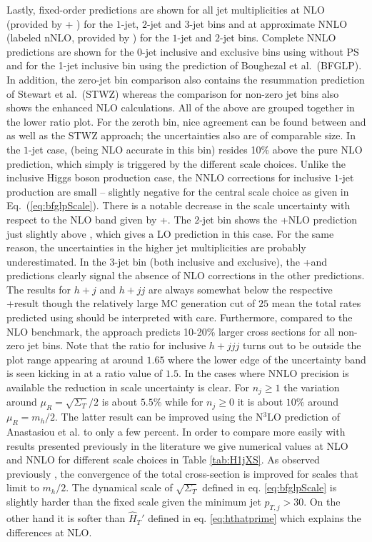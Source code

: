 Lastly, fixed-order predictions are shown for all jet multiplicities
at NLO (provided by \GoSam{}+ \Sherpa) for the $1$-jet, $2$-jet and
$3$-jet bins and at approximate NNLO (labeled nNLO, provided by \Loopsim) 
for the $1$-jet and $2$-jet bins.
Complete NNLO predictions are shown for the 0-jet inclusive and
exclusive bins using \Sherpa without PS and for the 1-jet inclusive
bin using the prediction of Boughezal et al.~(BFGLP).
In addition, the zero-jet bin comparison
also contains the resummation prediction of Stewart et
al.~(STWZ) whereas the comparison for non-zero jet bins also
shows the \Minlo enhanced NLO calculations. All of the above are
grouped together in the lower ratio plot. For the zeroth bin, nice
agreement can be found between \Powheg and \Sherpa \NNLOPS as well as
the STWZ approach; the uncertainties also are of comparable
size. In the $1$-jet case, \Powheg (being NLO accurate in this bin)
resides 10\% above the pure NLO prediction, which simply is triggered
by the different scale choices. Unlike the inclusive Higgs boson
production case, the NNLO corrections for inclusive $1$-jet production
are small -- slightly negative for the central scale choice as given
in Eq.~(\ref{eq:bfglpScale}). There is a notable decrease in the scale
uncertainty with respect to the NLO band given by \GoSam{}+\Sherpa. The $2$-jet bin
shows the \GoSam{}+\Sherpa NLO prediction just slightly above \Powheg, which
gives a LO prediction in this case. For the same reason, the \Powheg
uncertainties in the higher jet multiplicities are probably
underestimated. In the $3$-jet bin (both inclusive and exclusive), the
\GoSam{}+\Sherpa and \Sherpa \MEPSatNLO predictions clearly signal the absence of 
NLO corrections 
in the other predictions. The \Loopsim results for $h+j$ and
$h+jj$ are always somewhat below the respective \GoSam{}+\Sherpa result
though the relatively large MC generation cut of $25$ \gev mean
the total rates predicted using \Loopsim should be interpreted with care.
Furthermore, compared to the NLO benchmark, the \Minlo approach
predicts 10-20\% larger cross sections for all non-zero jet bins.
Note that the \Minlo ratio for inclusive
$h+jjj$ turns out to be outside the plot range appearing at around
$1.65$ where the lower edge of the uncertainty band is seen kicking in
at a ratio value of $1.5$. In the cases where NNLO precision is available
the reduction in scale uncertainty is clear. For $n_j\geq1$ the variation around
$\mu_R=\sqrt{\Sigma_T}/2$ is about $5.5\%$ while for $n_j\geq0$ it is about $10\%$
around $\mu_R=m_h/2$. The latter result can be improved using the N${}^3$LO prediction
of Anastasiou et al. \cite{Anastasiou:2015ema} to only a few percent. In order to compare more
easily with results presented previously in the literature we give numerical values at NLO and NNLO
for different scale choices in Table \ref{tab:H1jXS}. As observed previously \cite{Boughezal:2015dra},
the convergence of the total cross-section is improved for scales that limit to $m_h/2$. The dynamical scale
of $\sqrt{\Sigma_T}$ defined in eq. \eqref{eq:bfglpScale} is slightly harder than the fixed scale given the
minimum jet $p_{T,j}>30$. On the other hand it is softer than $\hat{H}_T'$ defined in eq. \eqref{eq:hthatprime} which explains
the differences at NLO.

